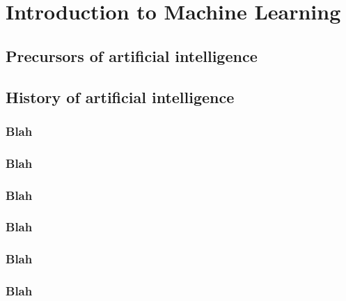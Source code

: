 \renewcommand{\prevpart}{0 }
\renewcommand{\thispart}{1 }
\renewcommand{\nextpart}{2 }

\section{Introduction to Machine Learning}





\subsection{Precursors of artificial intelligence}

\subsection{History of artificial intelligence}
\subsubsection{Blah}
\subsubsection{Blah}
\subsubsection{Blah}
\subsubsection{Blah}
\subsubsection{Blah}
\subsubsection{Blah}



%
%
%

